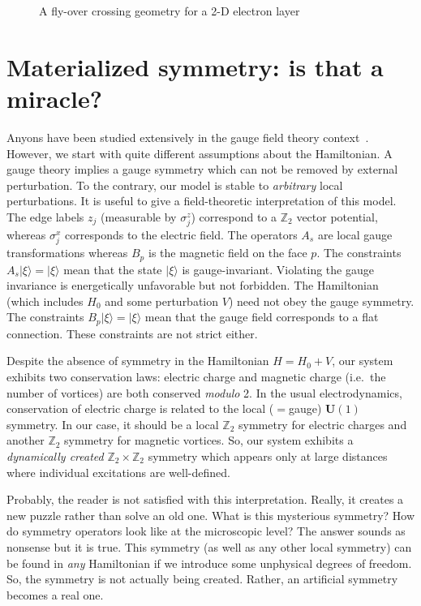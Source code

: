 \documentclass[12pt]{article}
\newcommand*{\epsfscale}[1]{\def\epsfsize##1##2{#1##1}}
\newcommand{\Z}{\mathbb{Z}}
\newcommand{\U}{\mathbf{U}}
\begin{document}
\begin{figure}[t]
\centerline{\epsfscale{0.6}}
\caption{A fly-over crossing geometry for a 2-D electron layer}
\label{fig_crossing}
\end{figure}


\section{Materialized symmetry: is that a miracle?} \label{sec_matsymm}

Anyons have been studied extensively in the gauge field theory
context~\cite{Wil,DPR,BDP,LP}. However, we start with quite different
assumptions about the Hamiltonian. A gauge theory implies a gauge symmetry
which can not be removed by external perturbation. To the contrary, our model
is stable to \emph{arbitrary} local perturbations. It is useful to give a
field-theoretic interpretation of this model. The edge labels $z_j$
(measurable by $\sigma^z_j$) correspond to a $\Z_2$ vector potential, whereas
$\sigma^x_j$ corresponds to the electric field. The operators $A_s$ are local
gauge transformations whereas $B_p$ is the magnetic field on the face $p$.
The constraints $A_s|\xi\rangle=|\xi\rangle$ mean that the state $|\xi\rangle$
is gauge-invariant. Violating the gauge invariance is energetically
unfavorable but not forbidden. The Hamiltonian (which includes $H_0$ and some
perturbation $V$) need not obey the gauge symmetry. The constraints
$B_p|\xi\rangle=|\xi\rangle$ mean that the gauge field corresponds to a flat
connection. These constraints are not strict either.

Despite the absence of symmetry in the Hamiltonian $H=H_0+V$, 
our system exhibits two conservation laws: electric charge and magnetic charge 
(i.e.\ the number of vortices) are both conserved \emph{modulo} 2. 
In the usual electrodynamics, conservation of electric charge is related 
to the local ($=$gauge) $\U(1)$ symmetry. In our case, it should be a local 
$\Z_2$ symmetry for electric charges and another $\Z_2$ symmetry for magnetic 
vortices. So, our system exhibits a \emph{dynamically created} $\Z_2\times\Z_2$ 
symmetry which appears only at large distances where individual excitations 
are well-defined. 

Probably, the reader is not satisfied with this interpretation. Really, it 
creates a new puzzle rather than solve an old one. What is this mysterious 
symmetry? How do symmetry operators look like at the microscopic level? 
The answer sounds as nonsense but it is true. This symmetry (as well 
as any other local symmetry) can be found in \emph{any} Hamiltonian if we 
introduce some unphysical degrees of freedom. So, the symmetry is not actually 
being created. Rather, an artificial symmetry becomes a real one.
\end{document}
